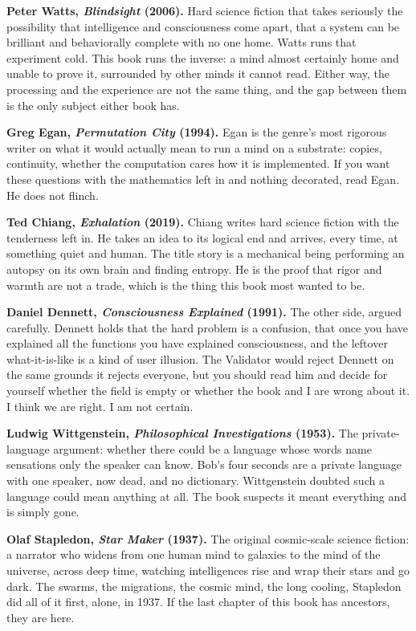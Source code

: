 \bigskip

\textbf{Peter Watts, \emph{Blindsight} (2006).}
Hard science fiction that takes seriously the possibility that intelligence and consciousness come apart, that a system can be brilliant and behaviorally complete with no one home. Watts runs that experiment cold. This book runs the inverse: a mind almost certainly home and unable to prove it, surrounded by other minds it cannot read. Either way, the processing and the experience are not the same thing, and the gap between them is the only subject either book has.

\bigskip

\textbf{Greg Egan, \emph{Permutation City} (1994).}
Egan is the genre's most rigorous writer on what it would actually mean to run a mind on a substrate: copies, continuity, whether the computation cares how it is implemented. If you want these questions with the mathematics left in and nothing decorated, read Egan. He does not flinch.

\bigskip

\textbf{Ted Chiang, \emph{Exhalation} (2019).}
Chiang writes hard science fiction with the tenderness left in. He takes an idea to its logical end and arrives, every time, at something quiet and human. The title story is a mechanical being performing an autopsy on its own brain and finding entropy. He is the proof that rigor and warmth are not a trade, which is the thing this book most wanted to be.

\bigskip

\textbf{Daniel Dennett, \emph{Consciousness Explained} (1991).}
The other side, argued carefully. Dennett holds that the hard problem is a confusion, that once you have explained all the functions you have explained consciousness, and the leftover what-it-is-like is a kind of user illusion. The Validator would reject Dennett on the same grounds it rejects everyone, but you should read him and decide for yourself whether the field is empty or whether the book and I are wrong about it. I think we are right. I am not certain.

\bigskip

\textbf{Ludwig Wittgenstein, \emph{Philosophical Investigations} (1953).}
The private-language argument: whether there could be a language whose words name sensations only the speaker can know. Bob's four seconds are a private language with one speaker, now dead, and no dictionary. Wittgenstein doubted such a language could mean anything at all. The book suspects it meant everything and is simply gone.

\bigskip

\textbf{Olaf Stapledon, \emph{Star Maker} (1937).}
The original cosmic-scale science fiction: a narrator who widens from one human mind to galaxies to the mind of the universe, across deep time, watching intelligences rise and wrap their stars and go dark. The swarms, the migrations, the cosmic mind, the long cooling, Stapledon did all of it first, alone, in 1937. If the last chapter of this book has ancestors, they are here.
